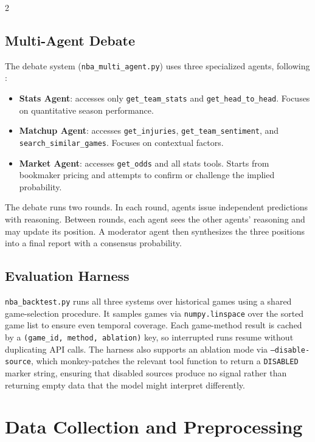 \documentclass[11pt]{article}
\begin{document}
\begin{multicols}{2}
\subsection{Multi-Agent Debate}

The debate system (\texttt{nba\_multi\_agent.py}) uses three specialized agents, following \citet{du2024}:

\begin{itemize}[leftmargin=*]
    \item \textbf{Stats Agent}: accesses only \texttt{get\_team\_stats} and \texttt{get\_head\_to\_head}. Focuses on quantitative season performance.
    \item \textbf{Matchup Agent}: accesses \texttt{get\_injuries}, \texttt{get\_team\_sentiment}, and \texttt{search\_similar\_games}. Focuses on contextual factors.
    \item \textbf{Market Agent}: accesses \texttt{get\_odds} and all stats tools. Starts from bookmaker pricing and attempts to confirm or challenge the implied probability.
\end{itemize}

The debate runs two rounds. In each round, agents issue independent predictions with reasoning. Between rounds, each agent sees the other agents' reasoning and may update its position. A moderator agent then synthesizes the three positions into a final report with a consensus probability.

\subsection{Evaluation Harness}

\texttt{nba\_backtest.py} runs all three systems over historical games using a shared game-selection procedure. It samples games via \texttt{numpy.linspace} over the sorted game list to ensure even temporal coverage. Each game-method result is cached by a \texttt{(game\_id, method, ablation)} key, so interrupted runs resume without duplicating API calls. The harness also supports an ablation mode via \texttt{--disable-source}, which monkey-patches the relevant tool function to return a \texttt{DISABLED} marker string, ensuring that disabled sources produce no signal rather than returning empty data that the model might interpret differently.

\section{Data Collection and Preprocessing}


\end{multicols}
\end{document}

